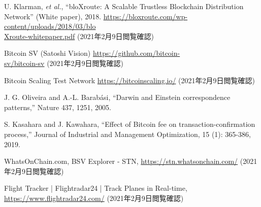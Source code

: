\documentclass[graybox]{svmult}
\begin{document}
\begin{thebibliography}{99}
  U. Klarman, \textit{et al.},
  ``bloXroute: A Scalable Trustless Blockchain Distribution Network''
  (White paper), 2018.
  \url{https://bloxroute.com/wp-content/uploads/2018/03/blo}\\
  \url{Xroute-whitepaper.pdf}
  (2021年2月9日閲覧確認)


  Bitcoin SV (Satoshi Vision) 
  \url{https://github.com/bitcoin-}\\
  \url{sv/bitcoin-sv}
  (2021年2月9日閲覧確認)

  Bitcoin Scaling Test Network
  \url{https://bitcoinscaling.io/}
  (2021年2月9日閲覧確認)


%
%


  J. G. Oliveira and A.-L. Barab\'asi,
  ``Darwin and Einstein correspondence patterns,'' 
  Nature 437, 1251, 2005.


  S. Kasahara and J. Kawahara,
  ``Effect of Bitcoin fee on transaction-confirmation process,''
  Journal of Industrial and Management Optimization, 15 (1): 365-386, 2019.


  WhatsOnChain.com, BSV Explorer - STN,
  \url{https://stn.whatsonchain.com/}
  (2021年2月9日閲覧確認)



  Flight Tracker | Flightradar24 | Track Planes in Real-time,
  \url{https://www.flightradar24.com/}
  (2021年2月9日閲覧確認)






\end{thebibliography}
\end{document}
